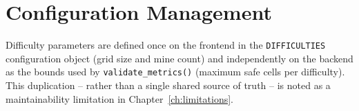 \section{Configuration Management}
Difficulty parameters are defined once on the frontend in the
\texttt{DIFFICULTIES} configuration object (grid size and mine count) and
independently on the backend as the bounds used by
\texttt{validate\_metrics()} (maximum safe cells per difficulty). This
duplication -- rather than a single shared source of truth -- is noted as a
maintainability limitation in Chapter~\ref{ch:limitations}.
